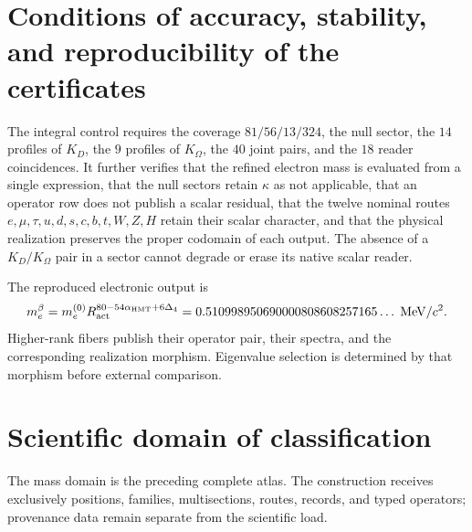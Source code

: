 \section{Conditions of accuracy, stability, and reproducibility of the certificates}
\label{sec:ejecucion-tabla-masas-acumulativa}

The integral control requires the coverage \(81/56/13/324\), the null sector, the \(14\) profiles of \(K_D\), the \(9\) profiles of \(K_\Omega\), the \(40\) joint pairs, and the \(18\) reader coincidences. It further verifies that the refined electron mass is evaluated from a single expression, that the null sectors retain \(\kappa\) as not applicable, that an operator row does not publish a scalar residual, that the twelve nominal routes \(e,\mu,\tau,u,d,s,c,b,t,W,Z,H\) retain their scalar character, and that the physical realization preserves the proper codomain of each output. The absence of a \(K_D/K_\Omega\) pair in a sector cannot degrade or erase its native scalar reader.

The reproduced electronic output is
\[
m_e^\beta
=m_e^{(0)}R_{\rm act}^{80-54\alpha_{\rm HMT}+6\Delta_4}
=0.510998950690000808608257165\ldots\;\mathrm{MeV}/c^2.
\]
Higher-rank fibers publish their operator pair, their spectra, and the
corresponding realization morphism. Eigenvalue selection is determined by
that morphism before external comparison.


\section{Scientific domain of classification}
\label{sec:alcance-publico-apendices-acumulativo}

The mass domain is the preceding complete atlas. The construction receives
exclusively positions, families, multisections, routes, records, and
typed operators; provenance data remain separate from the
scientific load.
